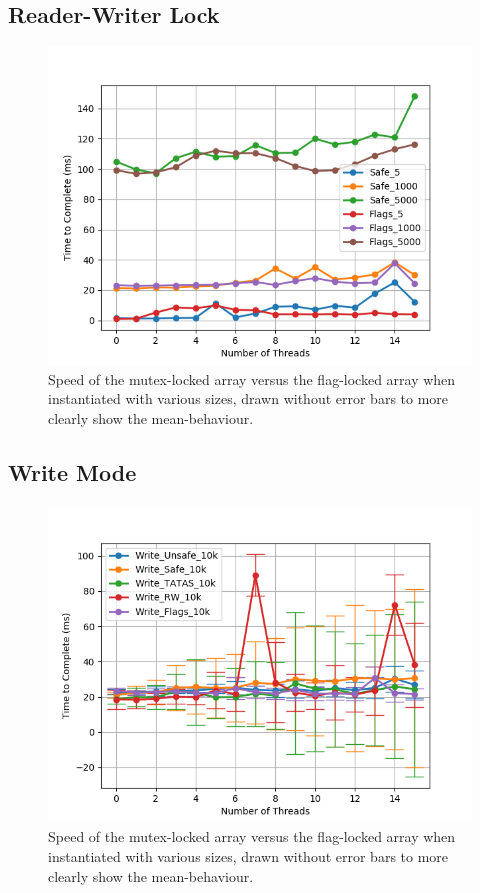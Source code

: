 \documentclass[11pt]{article}
\begin{document}
\subsection{Reader-Writer Lock}
\begin{figure}\label{step6_2}
\centering
\includegraphics[scale=0.65]{step6_2.png}
\caption{Speed of the mutex-locked array versus the flag-locked array when instantiated with various sizes, drawn without error bars to more clearly show the mean-behaviour.}
\end{figure}

\subsection{Write Mode}

\begin{figure}\label{step7_1}
\centering
\includegraphics[scale=0.65]{step7_1.png}
\caption{Speed of the mutex-locked array versus the flag-locked array when instantiated with various sizes, drawn without error bars to more clearly show the mean-behaviour.}
\end{figure}
\end{document}
